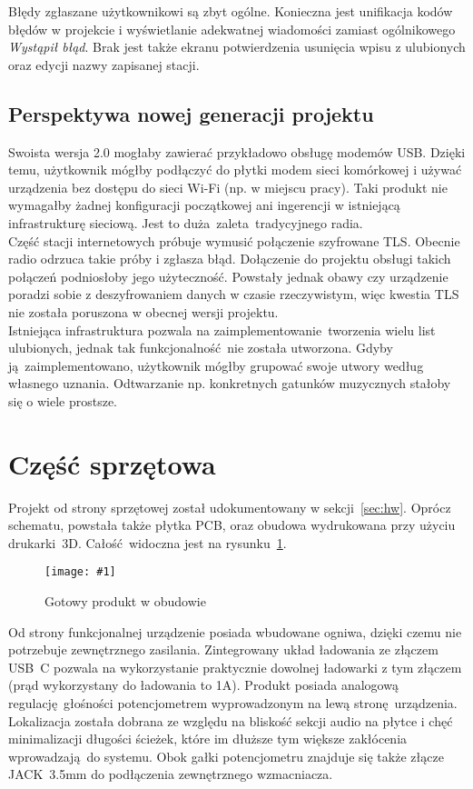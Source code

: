 \documentclass[polish]{aghengthesis}
\newcommand{\imgint}[4]{
	\begin{figure}[{#4}]
		\centering
		\texttt{[image: \#1]}
		\caption{#2}
		\label{#1}
	\end{figure}
}
\newcommand{\imgh}[3]{\imgint{#1}{#2}{#3}{H}}
\begin{document}
			Błędy zgłaszane użytkownikowi są zbyt ogólne. Konieczna jest unifikacja kodów błędów w projekcie i wyświetlanie adekwatnej wiadomości zamiast ogólnikowego \textit{Wystąpił błąd}. Brak jest także ekranu potwierdzenia usunięcia wpisu z ulubionych oraz edycji nazwy zapisanej stacji.
		
		\subsection{Perspektywa nowej generacji projektu}
			Swoista wersja 2.0 mogłaby zawierać przykładowo obsługę modemów USB. Dzięki temu, użytkownik mógłby podłączyć do płytki modem sieci komórkowej i używać urządzenia bez dostępu do sieci Wi-Fi (np. w miejscu pracy). Taki produkt nie wymagałby żadnej konfiguracji początkowej ani ingerencji w istniejącą infrastrukturę sieciową. Jest to duża zaleta tradycyjnego radia.
			$ $\\
			
			Część stacji internetowych próbuje wymusić połączenie szyfrowane TLS. Obecnie radio odrzuca takie próby i zgłasza błąd. Dołączenie do projektu obsługi takich połączeń podniosłoby jego użyteczność. Powstały jednak obawy czy urządzenie poradzi sobie z deszyfrowaniem danych w czasie rzeczywistym, więc kwestia TLS nie została poruszona w obecnej wersji projektu.
			$ $\\
			
			Istniejąca infrastruktura pozwala na zaimplementowanie tworzenia wielu list ulubionych, jednak tak funkcjonalność nie została utworzona. Gdyby ją zaimplementowano, użytkownik mógłby grupować swoje utwory według własnego uznania. Odtwarzanie np. konkretnych gatunków muzycznych stałoby się o wiele prostsze.
			
	\section{Część sprzętowa}
		Projekt od strony sprzętowej został udokumentowany w sekcji~\ref{sec:hw}. Oprócz schematu, powstała także płytka PCB, oraz obudowa wydrukowana przy użyciu drukarki~3D. Całość widoczna jest na rysunku~\ref{5/hw_result}.
		
		\imgh{5/hw_result}{Gotowy produkt w obudowie}{0.7}
		
		Od strony funkcjonalnej urządzenie posiada wbudowane ogniwa, dzięki czemu nie potrzebuje zewnętrznego zasilania. Zintegrowany układ ładowania ze złączem USB~C pozwala na wykorzystanie praktycznie dowolnej ładowarki z tym złączem (prąd wykorzystany do ładowania to 1A). Produkt posiada analogową regulację głośności potencjometrem wyprowadzonym na lewą stronę urządzenia. Lokalizacja została dobrana ze względu na bliskość sekcji audio na płytce i chęć minimalizacji długości ścieżek, które im dłuższe tym większe zakłócenia wprowadzają do systemu. Obok gałki potencjometru znajduje się także złącze JACK~3.5mm do podłączenia zewnętrznego wzmacniacza.
		
\end{document}
